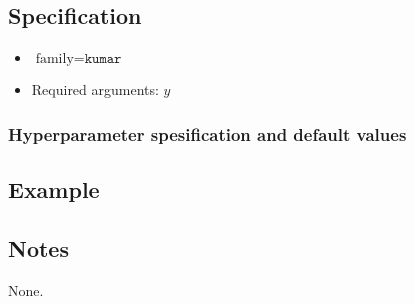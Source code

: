 \documentclass[a4paper,11pt]{article}
\begin{document}
\subsection*{Specification}

\begin{itemize}
\item $\text{family}=\texttt{kumar}$
\item Required arguments: $y$ 
\end{itemize}

\subsubsection*{Hyperparameter spesification and default values}




\subsection*{Example}



\subsection*{Notes}

None.
\end{document}
